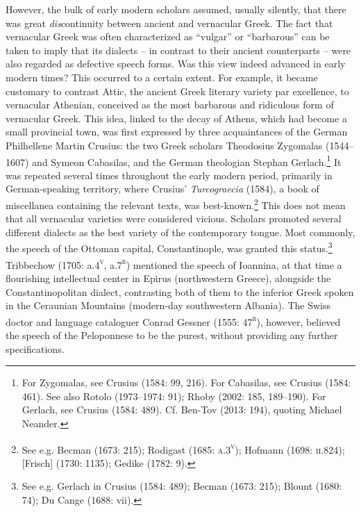 \begin{styleStandard}
However, the bulk of early modern scholars assumed, usually silently, that there was great \textit{dis}continuity between ancient and vernacular Greek. The fact that vernacular Greek was often characterized as “vulgar” or “barbarous” can be taken to imply that its dialects – in contrast to their ancient counterparts – were also regarded as defective speech forms. Was this view indeed advanced in early modern times? This occurred to a certain extent. For example, it became customary to contrast Attic, the ancient Greek literary variety par excellence, to vernacular Athenian, conceived as the most barbarous and ridiculous form of vernacular Greek. This idea, linked to the decay of Athens, which had become a small provincial town, was first expressed by three acquaintances of the German Philhellene Martin Crusius: the two Greek scholars Theodosius Zygomalas (1544–1607) and Symeon Cabasilas, and the German theologian Stephan Gerlach.\footnote{ For Zygomalas, see Crusius (1584: 99, 216). For Cabasilas, see Crusius (1584: 461). See also Rotolo (1973–1974: 91); Rhoby (2002: 185, 189–190). For Gerlach, see Crusius (1584: 489). Cf. Ben-Tov (2013: 194), quoting Michael Neander.} It was repeated several times throughout the early modern period, primarily in German-speaking territory, where Crusius’ \textit{Turcograecia} (1584), a book of miscellanea containing the relevant texts, was best-known.\footnote{ See e.g. Becman (1673: 215); Rodigast (1685: \textsc{a.3}\textsc{\textsuperscript{v}}); Hofmann (1698: \textsc{ii}.824); [Frisch] (1730: 1135); Gedike (1782: 9).} This does not mean that all vernacular varieties were considered vicious. Scholars promoted several different dialects as the best variety of the contemporary tongue. Most commonly, the speech of the Ottoman capital, Constantinople, was granted this status.\footnote{ See e.g. Gerlach in Crusius (1584: 489); Becman (1673: 215); Blount (1680: 74); Du Cange (1688: vii).} Tribbechow (1705: a.4\textsc{\textsuperscript{v}}, a.7\textsc{\textsuperscript{r}}) mentioned the speech of Ioannina, at that time a flourishing intellectual center in Epirus (northwestern Greece), alongside the Constantinopolitan dialect, contrasting both of them to the inferior Greek spoken in the Ceraunian Mountains (modern-day southwestern Albania). The Swiss doctor and language cataloguer Conrad Gessner (1555: 47\textsc{\textsuperscript{r}}), however, believed the speech of the Peloponnese to be the purest, without providing any further specifications.
\end{styleStandard}

